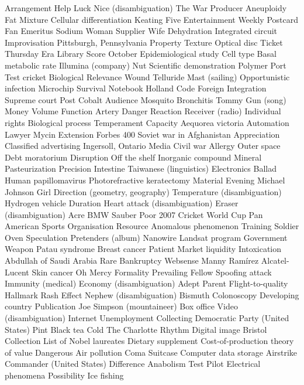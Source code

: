 Arrangement  Help  Luck  
Nice (disambiguation)  The War  Producer  
Aneuploidy  Fat  Mixture  
Cellular differentiation  Keating Five  Entertainment Weekly  
Postcard  Fan  Emeritus  
Sodium  Woman  Supplier  
Wife  Dehydration  Integrated circuit  
Improvisation  Pittsburgh, Pennsylvania  Property  
Texture  Optical disc  Ticket  
Thursday  Era  Library  
Score  October  Epidemiological study  
Cell type  Basal metabolic rate  Illumina (company)  
Nut  Scientific demonstration  Polymer  
Port  Test cricket  Biological  
Relevance  Wound  Telluride  
Mast (sailing)  Opportunistic infection  Microchip  
Survival  Notebook  Holland  
Code  Foreign  Integration  
Supreme court  Post  Cobalt  
Audience  Mosquito  Bronchitis  
Tommy Gun (song)  Money  Volume  
Function  Artery  Danger  
Reaction  Receiver (radio)  Individual rights  
Biological process  Temperament  Capacity  
Aequorea victoria  Automation  Lawyer  
Mycin  Extension  Forbes 400  
Soviet war in Afghanistan  Appreciation  Classified advertising  
Ingersoll, Ontario  Media  Civil war  
Allergy  Outer space  Debt moratorium  
Disruption  Off the shelf  Inorganic compound  
Mineral  Pasteurization  Precision  
Intestine  Taiwanese (linguistics)  Electronics  
Ballad  Human papillomavirus  Photorefractive keratectomy  
Material  Evening  Michael Johnson  
Girl  Direction (geometry, geography)  Temperature (disambiguation)  
Hydrogen vehicle  Duration  Heart attack (disambiguation)  
Eraser (disambiguation)  Acre  BMW Sauber  
Poor  2007 Cricket World Cup  Pan American Sports Organisation  
Resource  Anomalous phenomenon  Training  
Soldier  Oven  Speculation  
Pretenders (album)  Nanowire  Landsat program  
Government  Weapon  Patau syndrome  
Breast cancer  Patient  Market liquidity  
Intoxication  Abdullah of Saudi Arabia  Rare  
Bankruptcy  Websense  Manny Ramírez  
Alcatel-Lucent  Skin cancer  Oh Mercy  
Formality  Prevailing  Fellow  
Spoofing attack  Immunity (medical)  Economy (disambiguation)  
Adept  Parent  Flight-to-quality  
Hallmark  Rash  Effect  
Nephew (disambiguation)  Bismuth  Colonoscopy  
Developing country  Publication  Joe Simpson (mountaineer)  
Box office  Video (disambiguation)  Internet  
Unemployment  Collecting  Democratic Party (United States)  
Pint  Black tea  Cold  
The Charlotte  Rhythm  Digital image  
Bristol  Collection  List of Nobel laureates  
Dietary supplement  Cost-of-production theory of value  Dangerous  
Air pollution  Coma  Suitcase  
Computer data storage  Airstrike  Commander (United States)  
Difference  Anabolism  Test Pilot  
Electrical phenomena  Possibility  Ice fishing  
